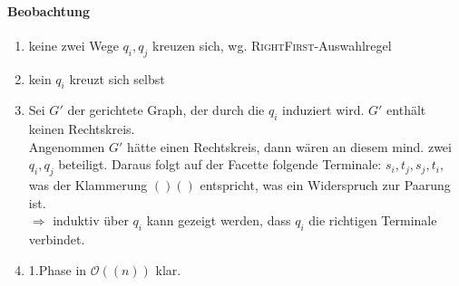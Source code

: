 \documentclass{article}
\renewcommand{\O}[1]{\mathcal{O}\left(#1\right)}
\begin{document}
\paragraph{Beobachtung} 
\begin{enumerate}
	\item keine zwei Wege $q_i, q_j$ kreuzen sich, wg. \textsc{RightFirst}-Auswahlregel
	\item kein $q_i$ kreuzt sich selbst
	\item Sei $G'$ der gerichtete Graph, der durch die $q_i$ induziert wird. $G'$ enthält keinen Rechtskreis.\\
	Angenommen $G'$ hätte einen Rechtskreis, dann wären an diesem mind. zwei $q_i, q_j$ beteiligt. Daraus folgt auf der Facette folgende Terminale: $s_i, t_j, s_j, t_i$, was der Klammerung $()()$ entspricht, was ein Widerspruch zur Paarung ist.\\
	$\Longrightarrow$ induktiv über $q_i$ kann gezeigt werden, dass $q_i$ die richtigen Terminale verbindet.
	\item 1.Phase in $\O{(n)}$ klar.
\end{enumerate}
\end{document}

